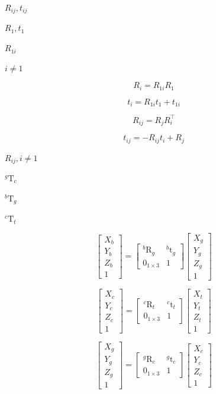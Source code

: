 \documentclass{article}
\begin{document}
$R_{ij}, t_{ij}$
\pagebreak

$R_1, t_1$
\pagebreak

$R_{1i}$
\pagebreak

$i\not=1$
\pagebreak

\[ R_i = R_{1i} R_1\]
\pagebreak

\[ t_i = R_{1i} t_1 + t_{1i}\]
\pagebreak

\[ R_{ij} = R_j R_i^\top \]
\pagebreak

\[ t_{ij} = -R_{ij} t_i + R_j \]
\pagebreak

$R_{ij}, i\not=1$
\pagebreak

$_{}^{g}\textrm{T}_c$
\pagebreak

$_{}^{b}\textrm{T}_g$
\pagebreak

$_{}^{c}\textrm{T}_t$
\pagebreak

\[    \begin{bmatrix}
    X_b\\
    Y_b\\
    Z_b\\
    1
    \end{bmatrix}
    =
    \begin{bmatrix}
    _{}^{b}\textrm{R}_g & _{}^{b}\textrm{t}_g \\
    0_{1 \times 3} & 1
    \end{bmatrix}
    \begin{bmatrix}
    X_g\\
    Y_g\\
    Z_g\\
    1
    \end{bmatrix}
\]
\pagebreak

\[    \begin{bmatrix}
    X_c\\
    Y_c\\
    Z_c\\
    1
    \end{bmatrix}
    =
    \begin{bmatrix}
    _{}^{c}\textrm{R}_t & _{}^{c}\textrm{t}_t \\
    0_{1 \times 3} & 1
    \end{bmatrix}
    \begin{bmatrix}
    X_t\\
    Y_t\\
    Z_t\\
    1
    \end{bmatrix}
\]
\pagebreak

\[    \begin{bmatrix}
    X_g\\
    Y_g\\
    Z_g\\
    1
    \end{bmatrix}
    =
    \begin{bmatrix}
    _{}^{g}\textrm{R}_c & _{}^{g}\textrm{t}_c \\
    0_{1 \times 3} & 1
    \end{bmatrix}
    \begin{bmatrix}
    X_c\\
    Y_c\\
    Z_c\\
    1
    \end{bmatrix}
\]
\pagebreak
\end{document}
